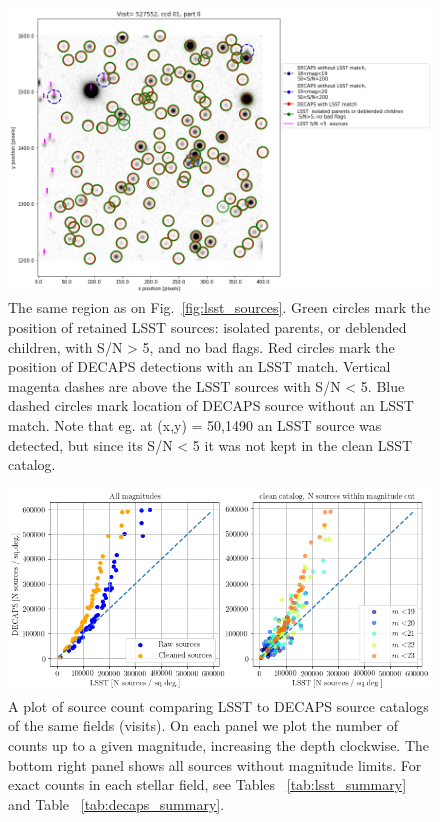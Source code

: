 \documentclass[DM,lsstdraft,toc,usenatbib]{lsstdoc}
\begin{document}
\begin{figure}
\begin{centering}
\includegraphics[width=1.0\columnwidth]{figs/visit_527552_ccd_1_lowSN.png}
\caption{The same region as on Fig.~\ref{fig:lsst_sources}. Green circles mark the position of retained LSST sources: isolated parents, or deblended children, with  S/N > 5, and no bad flags. Red circles mark the position of DECAPS detections with an LSST match. Vertical magenta dashes are above the LSST sources with S/N < 5.   Blue dashed circles mark location of DECAPS source without an LSST match. Note that eg. at (x,y) = 50,1490  an LSST source was detected, but since its  S/N < 5 it was not kept in the clean LSST catalog.   }
\label{fig:lsst_decaps_sources}
\end{centering}
\end{figure} 


\begin{figure}
\begin{centering}
\includegraphics[width=0.9\columnwidth]{figs/decaps_lsst_source_count.png}
\caption{A plot of source count comparing LSST to DECAPS source catalogs of the same fields (visits). 
On each panel we plot the number of counts up to a given magnitude, increasing the depth clockwise. 
The bottom right panel shows all sources without magnitude limits. For exact counts in each stellar field, see  Tables ~\ref{tab:lsst_summary} and Table ~\ref{tab:decaps_summary}.}
\label{fig:lsst_count_comparison}
\end{centering}
\end{figure} 
\end{document}
